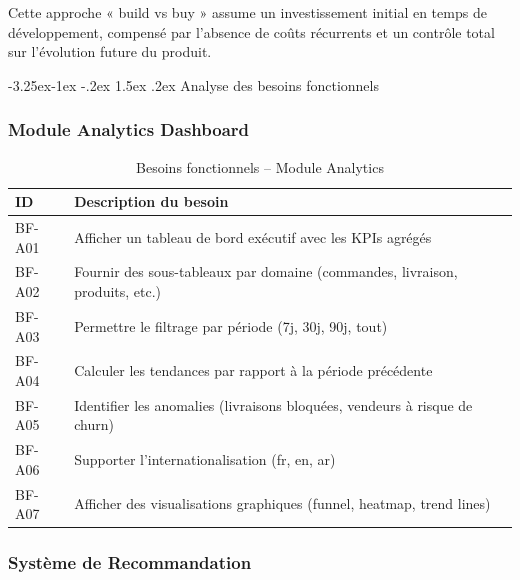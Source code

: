 \documentclass[12pt,a4paper,openany]{report}
\makeatletter
\renewcommand\subsection{\@startsection{subsection}{2}{\z@}%
  {-3.25ex\@plus -1ex \@minus -.2ex}%
  {1.5ex \@plus .2ex}%
  {\needspace{8\baselineskip}\normalfont\large\bfseries\color{primary!80!black}}}
\makeatother
\begin{document}
Cette approche « build vs buy » assume un investissement initial en temps de développement, compensé par l'absence de coûts récurrents et un contrôle total sur l'évolution future du produit.

\subsection{Analyse des besoins fonctionnels}

\subsubsection{Module Analytics Dashboard}

\begin{table}[H]
\centering
{}
\begin{tabularx}{\textwidth}{lX}
\toprule
\rowcolor{headerblue!20}
\textbf{ID} & \textbf{Description du besoin} \\
\midrule
BF-A01 & Afficher un tableau de bord exécutif avec les KPIs agrégés \\
BF-A02 & Fournir des sous-tableaux par domaine (commandes, livraison, produits, etc.) \\
BF-A03 & Permettre le filtrage par période (7j, 30j, 90j, tout) \\
BF-A04 & Calculer les tendances par rapport à la période précédente \\
BF-A05 & Identifier les anomalies (livraisons bloquées, vendeurs à risque de churn) \\
BF-A06 & Supporter l'internationalisation (fr, en, ar) \\
BF-A07 & Afficher des visualisations graphiques (funnel, heatmap, trend lines) \\
\bottomrule
\end{tabularx}
\caption{Besoins fonctionnels -- Module Analytics}
\end{table}

\subsubsection{Système de Recommandation}
\end{document}
